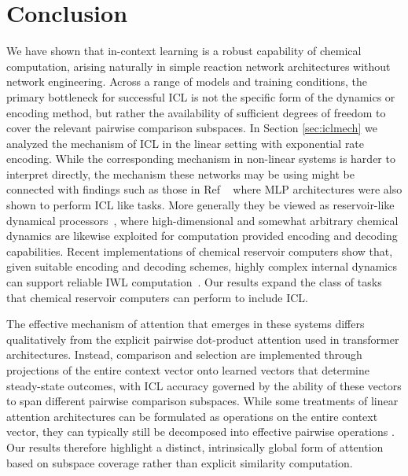 \documentclass[%
reprint,
superscriptaddress,
amsmath,amssymb,
aps,
]{revtex4-2}
\begin{document}
	
	
	\section{Conclusion}
	We have shown that in-context learning is a robust capability of chemical computation, arising naturally in simple reaction network architectures without network engineering. Across a range of models and training conditions, the primary bottleneck for successful ICL is not the specific form of the dynamics or encoding method, but rather the availability of sufficient degrees of freedom to cover the relevant pairwise comparison subspaces.
	In Section \ref{sec:iclmech} we analyzed the mechanism of ICL in the linear setting with exponential rate encoding. While the corresponding mechanism in non-linear systems is harder to interpret directly, the mechanism these networks may be using might be connected with findings such as those in Ref ~\cite{tong2024mlps} where MLP architectures were also shown to perform ICL like tasks. More generally they be viewed as reservoir-like dynamical processors~\cite{nakajima2021reservoir}, where high-dimensional and somewhat arbitrary chemical dynamics are likewise exploited for computation provided encoding and decoding capabilities. Recent implementations of chemical reservoir computers show that, given suitable encoding and decoding schemes, highly complex internal dynamics can support reliable IWL computation~\cite{baltussen2024chemical,ghosh2025recursive}. Our results expand the class of tasks that chemical reservoir computers can perform to include ICL.  
	
	The effective mechanism of attention that emerges in these systems differs qualitatively from the explicit pairwise dot-product attention used in transformer architectures. Instead, comparison and selection are implemented through projections of the entire context vector onto learned vectors that determine steady-state outcomes, with ICL accuracy governed by the ability of these vectors to span different pairwise comparison subspaces. While some treatments of linear attention architectures can be formulated as operations on the entire context vector, they can typically still be decomposed into effective pairwise operations \cite{lu2025asymptotic}. Our results therefore highlight a distinct, intrinsically global form of attention based on subspace coverage rather than explicit similarity computation.
	
\end{document}
